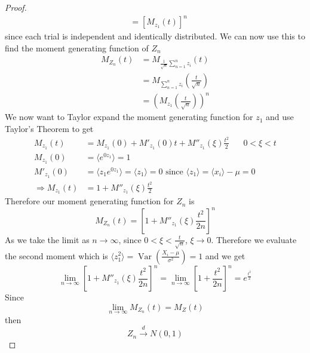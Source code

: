 \documentclass{article}
\newcommand{\twen}{\hspace{20pt}}
\theoremstyle{definition}
\begin{document}
\begin{proof}
\begin{equation*}
\begin{split}
            &= \left[ M_{z_1}(t)\right]^n
        \end{split}
    \end{equation*}
    since each trial is independent and identically distributed. We can now use this to find the moment generating function of $Z_n$
    \begin{equation*}
        \begin{split}
            M_{Z_n}(t) &= M_{\frac{1}{\sqrt{n}}\sum^n_{n=1} z_i}(t) \\
            &= M_{\sum^n_{n=1}z_i}\left(\frac{t}{\sqrt{n}}\right)\\
            &= \left( M_{z_1} \left(\frac{t}{\sqrt{n}} \right) \right)^n
        \end{split}
    \end{equation*}
    We now want to Taylor expand the moment generating function for $z_1$ and use Taylor's Theorem to get 
    \begin{equation*}
        \begin{split}
            M_{z_1}(t) &= M_{z_1}(0) + M'_{z_1}(0)t+M''_{z_1}(\xi) \frac{t^2}{2} \twen 0<\xi <t \\ M_{z_1}(0)&= \langle e^{0z_1}\rangle = 1 \\
            M'_{z_1}(0)&= \langle z_1 e^{0z_1}\rangle = \langle z_1 \rangle = 0 \text{ since } \langle z_1 \rangle = \langle x_i \rangle -\mu =0 \\
            \Rightarrow M_{z_1}(t)&= 1+M''_{z_1}(\xi) \frac{t^2}{2}
        \end{split}
    \end{equation*}
    Therefore our moment generating function for $Z_n$ is 
    \begin{equation*}
        M_{Z_n}(t) = \left[ 1+ M''_{z_1}(\xi) \frac{t^2}{2n}\right]^n
    \end{equation*}
    As we take the limit as $n\to \infty$, since $0 < \xi  <\frac{t}{\sqrt n}$, $\xi \to 0$. Therefore we evaluate the second moment which is $\langle z_1^2\rangle = \operatorname{Var}\left(\frac{X_i-\mu}{\sigma^2} \right) = 1$ and we get 
    \begin{equation*}
        \lim_{n\to \infty}\left[ 1+ M''_{z_1}(\xi) \frac{t^2}{2n}\right]^n = \lim_{n\to \infty} \left[ 1+\frac{t^2}{2n} \right]^n = e^{\frac{t^2}{2}}
    \end{equation*}
    Since 
    \begin{equation*}
        \lim_{n\to \infty}M_{Z_n}(t) = M_Z(t)
    \end{equation*}
    then 
    \begin{equation*}
        Z_n \overset{d}{\longrightarrow}N(0,1)
    \end{equation*}
\end{proof}
\end{document}
